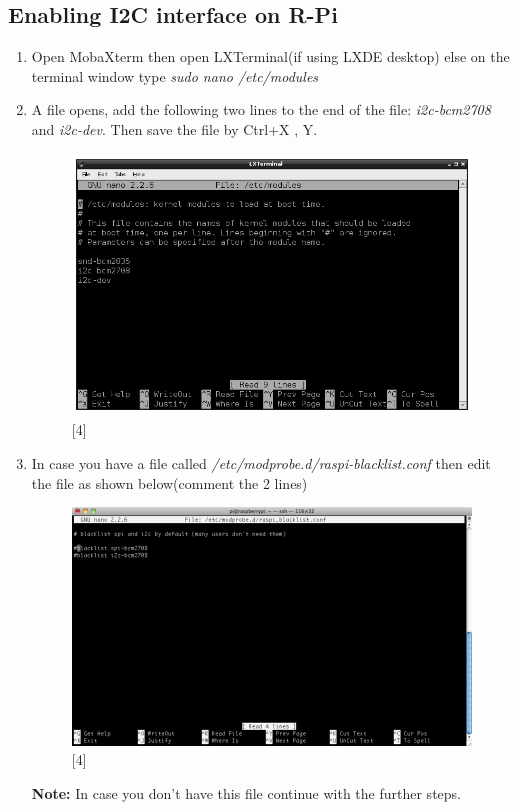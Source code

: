 \documentclass[11pt,a4paper]{article}
\begin{document}
	\subsection{Enabling I2C interface on R-Pi}
	\begin{enumerate}
		\item Open MobaXterm then open LXTerminal(if using LXDE desktop) else on the terminal window type \textit{sudo nano /etc/modules}
		\item A file opens, add the following two lines to the end of the file: \textit{i2c-bcm2708 } and  \textit{i2c-dev}. Then save the file by Ctrl+X , Y.
		\begin{figure}[h!]
			\includegraphics[width=11cm]{1.png}
			\centering
			\caption{[4]}
		\end{figure} 
		\item In case you have a file called \textit{/etc/modprobe.d/raspi-blacklist.conf} then edit the file as shown below(comment the 2 lines)
		\newpage
		\begin{figure}[h!]
			\includegraphics[scale=0.4]{2.png}
			\centering
			\caption{[4]}
		\end{figure}
		\textbf{Note:} In case you don't have this file continue with the further steps.
		

\end{enumerate}
\end{document}
